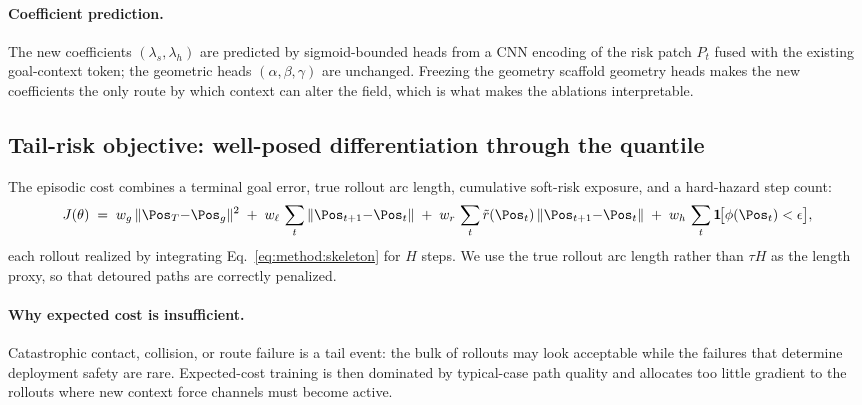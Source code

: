 \paragraph{Coefficient prediction.}
The new coefficients $(\lambda_s, \lambda_h)$ are predicted by
sigmoid-bounded heads from a CNN encoding of the risk patch $P_t$
fused with the existing goal-context token; the geometric heads
$(\alpha,\beta,\gamma)$ are unchanged. Freezing the geometry scaffold geometry
heads makes the new coefficients the only route by which context can
alter the field, which is what makes the ablations interpretable.

\subsection{Tail-risk objective: well-posed differentiation through the quantile}
\label{sec:method:cvar}

The episodic cost combines a terminal goal error, true rollout arc
length, cumulative soft-risk exposure, and a hard-hazard step count:
\begin{equation}
J(\theta) \;=\;
w_g\,\|\Pos_T{-}\Pos_g\|^2
\;+\; w_\ell\,\sum_t \|\Pos_{t+1}{-}\Pos_t\|
\;+\; w_r\,\sum_t \tilde r(\Pos_t)\,\|\Pos_{t+1}{-}\Pos_t\|
\;+\; w_h\,\sum_t \mathbf{1}\!\bigl[\phi(\Pos_t) < \epsilon\bigr],
\label{eq:method:J}
\end{equation}
each rollout realized by integrating Eq.~\eqref{eq:method:skeleton} for
$H$ steps. We use the true rollout arc length rather than $\tau H$ as
the length proxy, so that detoured paths are correctly penalized.

\paragraph{Why expected cost is insufficient.}
Catastrophic contact, collision, or route failure is a tail event: the
bulk of rollouts may look acceptable while the failures that determine
deployment safety are rare. Expected-cost training is then dominated by
typical-case path quality and allocates too little gradient to the
rollouts where new context force channels must become active.


